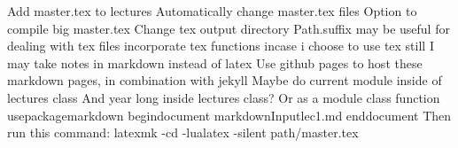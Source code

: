\markdownRendererUlItem Add master.tex to lectures\markdownRendererUlItemEnd 
\markdownRendererUlItem Automatically change master.tex files\markdownRendererUlItemEnd 
\markdownRendererUlItem Option to compile big master.tex\markdownRendererUlItemEnd 
\markdownRendererUlItem Change tex output directory\markdownRendererUlItemEnd 
\markdownRendererUlItem Path.suffix may be useful for dealing with tex files\markdownRendererUlItemEnd 
\markdownRendererUlItem incorporate tex functions incase i choose to use tex still\markdownRendererUlItemEnd 
\markdownRendererUlEndTight \markdownRendererInterblockSeparator
{}\markdownRendererInterblockSeparator
{}\markdownRendererUlBeginTight
\markdownRendererUlItem I may take notes in markdown instead of latex\markdownRendererUlItemEnd 
\markdownRendererUlItem Use github pages to host these markdown pages, in combination with jekyll\markdownRendererUlItemEnd 
\markdownRendererUlItem Maybe do current module inside of lectures class\markdownRendererUlItemEnd 
\markdownRendererUlItem And year long inside lectures class? Or as a module class function\markdownRendererUlItemEnd 
\markdownRendererUlEndTight \markdownRendererInterblockSeparator
{}\markdownRendererInterblockSeparator
{}\markdownRendererBackslash{}usepackage\markdownRendererLeftBrace{}markdown\markdownRendererRightBrace{} \markdownRendererBackslash{}begin\markdownRendererLeftBrace{}document\markdownRendererRightBrace{} \markdownRendererBackslash{}markdownInput\markdownRendererLeftBrace{}lec1.md\markdownRendererRightBrace{} \markdownRendererBackslash{}end\markdownRendererLeftBrace{}document\markdownRendererRightBrace{}\markdownRendererInterblockSeparator
{}\markdownRendererUlBeginTight
\markdownRendererUlItem Then run this command: latexmk -cd -lualatex -silent path/master.tex\markdownRendererUlItemEnd 
\markdownRendererUlEndTight \markdownRendererDocumentEnd